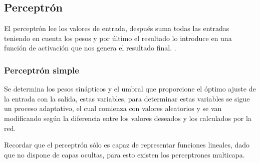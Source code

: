 \subsection{Perceptrón}
El perceptrón lee los valores de entrada, después suma todas las entradas teniendo en cuenta los pesos y por último el resultado lo introduce en una función de activación que nos genera el resultado final. \citep{perceptron2017}.

\subsubsection{Perceptrón simple}
Se determina los pesos sinápticos y el umbral que proporcione el óptimo ajuste de la entrada con la salida, estas variables, para determinar estas variables se sigue un proceso adaptativo, el cual  comienza con valores aleatorios y se van modificando según la diferencia entre los valores deseados y los calculados por la red.

Recordar que el perceptrón sólo es capaz de representar funciones lineales, dado que no dispone de capas ocultas, para esto existen los perceptrones multicapa.

